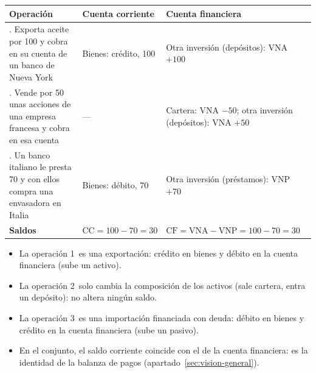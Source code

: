 \documentclass[11pt]{article}
\begin{document}
\begin{anotaciones}
\begin{tablacaja}
\caption{Tres operaciones de la almazara con los signos del MBP6 (unidades monetarias)}\label{tab:partida-cuadruple}
\small
\begin{tabular}{>{\raggedright\arraybackslash}m{5.4cm}>{\raggedright\arraybackslash}m{3.6cm}>{\raggedright\arraybackslash}m{4.4cm}}
\toprule
\rowcolor{tceeazulpalido}
\textbf{Operación} & \textbf{Cuenta corriente} & \textbf{Cuenta financiera} \\
\midrule
1. Exporta aceite por 100 y cobra en su cuenta de un banco de Nueva York & Bienes: crédito, 100 & Otra inversión (depósitos): VNA $+100$ \\
2. Vende por 50 unas acciones de una empresa francesa y cobra en esa cuenta & --- & Cartera: VNA $-50$; otra inversión (depósitos): VNA $+50$ \\
3. Un banco italiano le presta 70 y con ellos compra una envasadora en Italia & Bienes: débito, 70 & Otra inversión (préstamos): VNP $+70$ \\
\midrule
\textbf{Saldos} & $\mathrm{CC}=100-70=30$ & $\mathrm{CF}=\mathrm{VNA}-\mathrm{VNP}=100-70=30$ \\
\bottomrule
\end{tabular}
\end{tablacaja}
\begin{itemize}
\item La operación 1~es una exportación: crédito en bienes y débito en la cuenta financiera (sube un activo).
\item La operación 2~solo cambia la composición de los activos (sale cartera, entra un depósito): no altera ningún saldo.
\item La operación 3~es una importación financiada con deuda: débito en bienes y crédito en la cuenta financiera (sube un pasivo).
\item En el conjunto, el saldo corriente coincide con el de la cuenta financiera: es la identidad de la balanza de pagos (apartado~\ref{sec:vision-general}).
\end{itemize}
\end{anotaciones}
\end{document}
